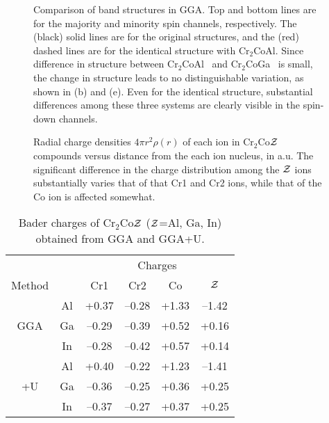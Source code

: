 \documentclass[preprint,5p]{elsarticle}
\newcommand{\ccg}{Cr$_2$CoGa}
\newcommand{\cca}{Cr$_2$CoAl}
\begin{document}
\begin{figure}[tbp]
{}
\caption{Comparison of band structures in GGA.
Top and bottom lines are for the majority and minority spin channels, respectively.
The (black) solid lines are for the original structures,
and the (red) dashed lines are for the identical structure with \cca.
Since difference in structure between \cca~ and \ccg~ is small, 
the change in structure leads to no distinguishable variation, as shown in (b) and (e).
Even for the identical structure, substantial differences among these three systems are clearly visible 
in the spin-down channels.
}
\label{bs2}
\end{figure}

\begin{figure}[tbp]
{}
\caption{Radial charge densities $4\pi r^2\rho(r)$ of each ion in Cr$_2$Co${\cal Z}$ compounds
versus distance from the each ion nucleus, in a.u.
The significant difference in the charge distribution among the ${\cal Z}$ ions
substantially varies that of that Cr1 and Cr2 ions, 
while that of the Co ion is affected somewhat.
}
\label{radchar}
\end{figure}


\begin{table}
\caption{Bader charges of Cr$_2$Co${\cal Z}$ (${\cal Z}$=Al, Ga, In) 
obtained from GGA and GGA+U.
}
\begin{tabular}{cccccc}\hline\hline
 \multicolumn{2}{c}{}&\multicolumn{4}{c}{Charges}\\\cline{3-6}
 Method&~& Cr1 & Cr2 & Co & ${\cal Z}$ \\ \hline
 ~ & Al  & +0.37 & --0.28 & +1.33 & --1.42 \\
GGA & Ga & --0.29 & --0.39 & +0.52 & +0.16 \\
~    & In & --0.28 & --0.42 & +0.57 & +0.14 \\\hline
 ~ & Al  & +0.40 & --0.22 & +1.23 & --1.41 \\
+U & Ga & --0.36 & --0.25 & +0.36 & +0.25 \\
~    & In & --0.37 & --0.27 & +0.37 & +0.25 \\
\hline\hline
\end{tabular}
\label{table2}
\end{table}
\end{document}
